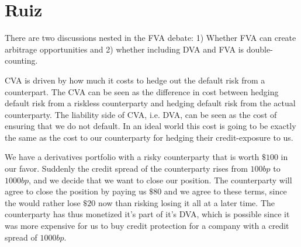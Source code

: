 \documentclass[10pt,a4paper]{article}
\begin{document}
     \section{Ruiz}
        There are two discussions nested in the FVA debate: 1) Whether FVA can create arbitrage opportunities and 2) whether including DVA and FVA is double-counting.

        CVA is driven by how much it costs to hedge out the default risk from a counterpart. The CVA can be seen as the difference in cost between hedging default risk from a riskless counterparty and hedging default risk from the actual counterparty. The liability side of CVA, i.e. DVA, can be seen as the cost of ensuring that we do not default. In an ideal world this cost is going to be exactly the same as the cost to our counterparty for hedging their credit-exposure to us. 

        We have a derivatives portfolio with a risky counterparty that is worth $\$100$ in our favor. Suddenly the credit spread of the counterparty rises from $100bp$ to $1000bp$, and we decide that we want to close our position. The counterparty will agree to close the position by paying us $\$80$ and we agree to these terms, since the would rather lose $\$20$ now than risking losing it all at a later time. The counterparty has thus monetized it's part of it's DVA, which is possible since it was more expensive for us to buy credit protection for a company with a credit spread of $1000bp$.
\end{document}
